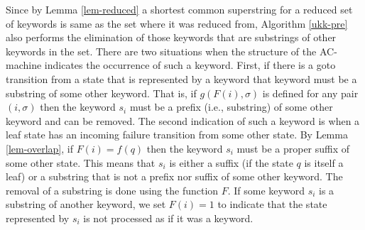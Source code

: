 \documentclass[english,twoside,censored,csm,algorithms-track-2020]{HYthesisML}
\theoremstyle{plain}
\theoremstyle{definition}
\begin{document}
\vspace{1cm}
Since by Lemma \ref{lem-reduced} a shortest common superstring for a reduced set of keywords
is same as the set where it was reduced from, Algorithm \ref{ukk-pre} also performs
the elimination of those keywords that are substrings of other keywords in the set. There are two
situations when the structure of the AC-machine indicates the occurrence of such a keyword. First,
if there is a goto transition from a state that is represented by a keyword that keyword
must be a substring of some other keyword. That is, if $g(F(i),\sigma)$ is defined for any pair
$(i,\sigma)$ then the keyword $s_i$ must be a prefix (i.e., substring) of some other keyword and can be
removed. The second indication of such a keyword is when a leaf state has an incoming failure
transition from some other state. By Lemma \ref{lem-overlap}, if $F(i) = f(q)$ then the keyword
$s_i$ must be a proper suffix of some other state. This means that $s_i$ is either a suffix
(if the state $q$ is itself a leaf) or a substring that is not a prefix nor suffix of some other
keyword. The removal of a substring is done using the function $F$. If some keyword
$s_i$ is a substring of another keyword, we set $F(i)=1$ to indicate that the state represented
by $s_i$ is not processed as if it was a keyword.
\end{document}
